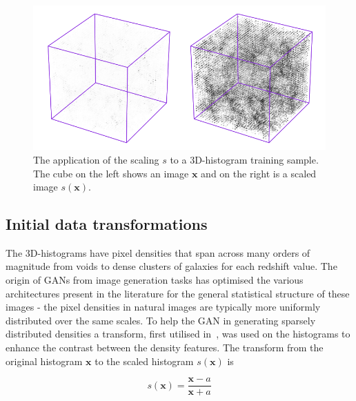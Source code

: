 \documentclass[twocolumn]{article}
\numberwithin{equation}{section}
\begin{document}
\begin{figure}
\includegraphics[width=\columnwidth]{figures/diagrams/scale_fig.png}%
\centering
\caption{The application of the scaling $s$ to a 3D-histogram training sample. The cube on the left shows an 
image $\mathbf{x}$ and on the right is a scaled image $s(\mathbf{x})$.}
\label{fig:scaling}
\end{figure}


\subsection{Initial data transformations} 
The 3D-histograms have pixel densities that span across many orders of magnitude from voids to dense clusters of galaxies 
for each redshift value. The origin of GANs from image generation tasks has optimised the various architectures present in 
the literature for the general statistical structure of these images - the pixel densities in natural images are typically 
more uniformly distributed over the same scales. To help the GAN in generating sparsely distributed densities a transform, 
first utilised in~\cite{web_gan}, was used on the histograms to enhance the contrast between the density features. The 
transform from the original histogram $\mathbf{x}$ to the scaled histogram $s(\mathbf{x})$ is 

\begin{equation}
    s(\mathbf{x}) = \frac{\mathbf{x} - a}{\mathbf{x} + a}
\end{equation}
\end{document}

